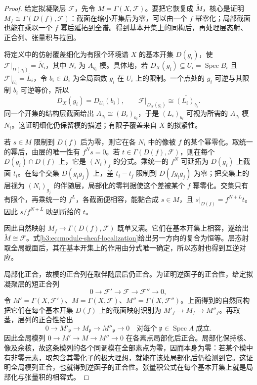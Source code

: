 \begin{proof}
	给定拟凝聚层 \(\mathcal F\)，先令 \(M=\Gamma(X,\mathcal F)\)。要把它恢复成 \(\widetilde M\)，核心是证明 \(M_f\cong\Gamma(D(f),\mathcal F)\)：截面在缩小开集后为零，可以由一个 \(f\) 幂零化；局部截面也能在乘以一个 \(f\) 幂后延拓到全谱。得到基本开集上的同构后，再处理层态射、正合列、张量积与拉回。

	将定义中的仿射覆盖细化为有限个环境谱 \(X\) 的基本开集 \(D(g_i)\)，使 \(\mathcal F|_{D(g_i)}=\widetilde{N_i}\)，其中 \(N_i\) 为 \(A_{g_i}\) 模。具体地，若 \(D_X(g_i)\subseteq U_i=\operatorname{Spec}B_i\) 且 \(\mathcal F|_{U_i}=\widetilde{L_i}\)，令 \(b_i\in B_i\) 为全局函数 \(g_i\) 在 \(U_i\) 上的限制。一个点处的 \(g_i\) 可逆与其限制 \(b_i\) 可逆等价，所以
	\[
		D_X(g_i)=D_{U_i}(b_i),\qquad \mathcal F|_{D_X(g_i)}\cong\widetilde{(L_i)_{b_i}}.
	\]
	同一个开集的结构层截面给出 \(A_{g_i}\cong(B_i)_{b_i}\)，于是 \((L_i)_{b_i}\) 可视为所需的 \(A_{g_i}\) 模 \(N_i\)。这证明细化仍保留模的描述；有限子覆盖来自 \(X\) 的拟紧性。

	若 \(s\in M\) 限制到 \(D(f)\) 后为零，则它在各 \(N_i\) 中的像被 \(f\) 的某个幂零化。取统一的幂后，由层的唯一性有 \(f^Ns=0\)。若 \(t\in\Gamma(D(f),\mathcal F)\)，则在每个 \(D(g_i)\cap D(f)\) 上，它是 \((N_i)_f\) 的分式。乘统一的 \(f^N\) 可延拓为 \(D(g_i)\) 上截面 \(t_i\)。在每个交集 \(D(g_ig_j)\) 上，差 \(t_i-t_j\) 限制到 \(D(fg_ig_j)\) 为零；把交集上的层视为 \((N_i)_{g_j}\) 的伴随层，局部化的零判据使这个差被某个 \(f\) 幂零化。交集只有有限个，再乘统一的 \(f^L\)，各截面便相容，能黏合成 \(s\in M\)，且 \(s|_{D(f)}=f^{N+L}t\)。因此 \(s/f^{N+L}\) 映到所给的 \(t\)。

	因此自然映射 \(M_f\rightarrow\Gamma(D(f),\mathcal F)\) 既单又满。它们在基本开集上相容，遂给出 \(\widetilde M\cong\mathcal F\)。式\eqref{b3:eq:module-sheaf-localization}给出另一方向的复合为恒等。层态射取全局截面后，其在基本开集上的作用由分式唯一确定，所以态射也得到互逆对应。

	局部化正合，故模的正合列在取伴随层后仍正合。为证明逆函子的正合性，给定拟凝聚层的短正合列
	\[
		0\longrightarrow\mathcal F'\longrightarrow\mathcal F \longrightarrow\mathcal F''\longrightarrow0,
	\]
	令 \(M'=\Gamma(X,\mathcal F')\)、\(M=\Gamma(X,\mathcal F)\)、\(M''=\Gamma(X,\mathcal F'')\)。上面得到的自然同构把它们在每个基本开集 \(D(f)\) 上的截面映射识别为 \(M'_f\rightarrow M_f\rightarrow M''_f\)。再取茎，层列的正合性给出
	\[
		0\longrightarrow M'_{\mathfrak p}\longrightarrow M_{\mathfrak p} \longrightarrow M''_{\mathfrak p}\longrightarrow0 \quad\text{对每个}\;\mathfrak p\in\operatorname{Spec}A\;\text{成立}.
	\]
	因此全局模列 \(0\rightarrow M'\rightarrow M\rightarrow M''\rightarrow0\) 在各素点局部化后正合。局部化保持核、像及余核，故这条模列的各个同调模在全部素点为零，因而本身为零：若某个模中有非零元素，取包含其零化子的极大理想，就能在该处局部化后仍检测到它。这证明全局模列正合，也就得到逆函子的正合性。张量积公式在每个基本开集上就是局部化与张量积的相容式。


\end{proof}

